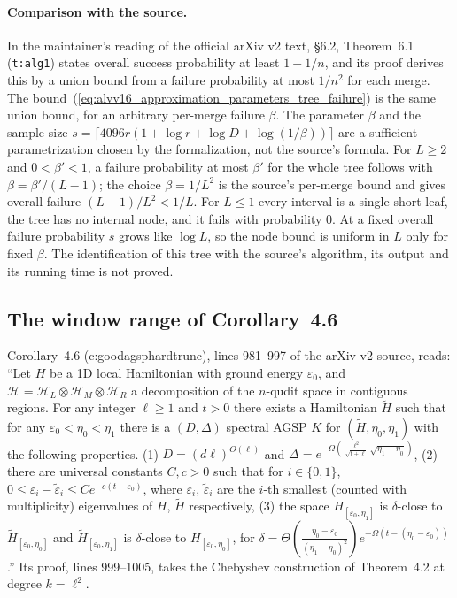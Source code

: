 \documentclass{article}
\begin{document}
\paragraph{Comparison with the source.}
In the maintainer's reading of the official arXiv v2 text, \S6.2,
Theorem~6.1 (\texttt{t:alg1}) states overall success probability at least
$1-1/n$, and its proof derives this by a union bound from a failure
probability at most $1/n^2$ for each merge. The
bound~(\ref{eq:alvv16_approximation_parameters_tree_failure}) is the same union bound, for an arbitrary per-merge
failure $\beta$. The parameter $\beta$ and the sample size
$s=\lceil4096 r(1+\log r+\log D+\log(1/\beta))\rceil$ are a sufficient
parametrization chosen by the formalization, not the source's formula.
For $L\ge2$ and $0<\beta'<1$, a failure probability at most $\beta'$ for the
whole tree follows with $\beta=\beta'/(L-1)$; the choice $\beta=1/L^2$ is
the source's per-merge bound and gives overall failure $(L-1)/L^2<1/L$.
For $L\le1$ every interval is a single short leaf, the tree has no internal
node, and it fails with probability $0$. At a fixed overall failure
probability $s$ grows like $\log L$, so the node bound is uniform in $L$
only for fixed $\beta$. The identification of this tree with the source's
algorithm, its output and its running time is not proved.

\subsection*{The window range of Corollary~4.6}

Corollary~4.6 (c:goodagsphardtrunc), lines 981--997 of the arXiv v2 source,
reads: ``Let $H$ be a 1D local Hamiltonian with ground energy
$\varepsilon_0$, and $\mathcal H=\mathcal H_L\otimes\mathcal H_M\otimes
\mathcal H_R$ a decomposition of the $n$-qudit space in contiguous regions.
For any integer $\ell\ge1$ and $t>0$ there exists a Hamiltonian $\tilde H$
such that for any $\varepsilon_0<\eta_0<\eta_1$ there is a $(D,\Delta)$
spectral AGSP $K$ for $(\tilde H,\eta_0,\eta_1)$ with the following
properties. (1) $D=(d\ell)^{O(\ell)}$ and
$\Delta=e^{-\Omega(\frac{\ell^2}{\sqrt{t+\ell}}\sqrt{\eta_1-\eta_0})}$,
(2) there are universal constants $C,c>0$ such that for $i\in\{0,1\}$,
$0\le\varepsilon_i-\tilde\varepsilon_i\le Ce^{-c(t-\varepsilon_0)}$, where
$\varepsilon_i$, $\tilde\varepsilon_i$ are the $i$-th smallest (counted with
multiplicity) eigenvalues of $H$, $\tilde H$ respectively, (3) the space
$H_{[\varepsilon_0,\eta_1]}$ is $\delta$-close to
$\tilde H_{[\tilde\varepsilon_0,\eta_0]}$ and
$\tilde H_{[\tilde\varepsilon_0,\eta_1]}$ is $\delta$-close to
$H_{[\varepsilon_0,\eta_0]}$, for
$\delta=\Theta(\frac{\eta_0-\varepsilon_0}{(\eta_1-\eta_0)^2})
e^{-\Omega(t-(\eta_0-\varepsilon_0))}$.'' Its proof, lines 999--1005, takes the
Chebyshev construction of Theorem~4.2 at degree $k=\ell^2$.
\end{document}
